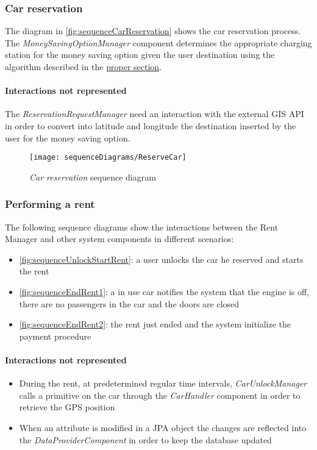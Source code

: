 \subsubsection{Car reservation}
The diagram in \autoref{fig:sequenceCarReservation} shows the car reservation process.\\
The \mbox{\emph{MoneySavingOptionManager}} component determines the appropriate charging station for the money saving option given the user destination using the algorithm described in the \hyperref[sec:msoAlgorithm]{proper section}.

\paragraph{Interactions not represented}The \emph{ReservationRequestManager} need an interaction with the external GIS API in order to convert into latitude and longitude the destination inserted by the user for the money saving option.
\begin{figure}[h!]
	\centering
	\texttt{[image: sequenceDiagrams/ReserveCar]}
	\caption{
		\label{fig:sequenceCarReservation} 
		\emph{Car reservation} sequence diagram
	}
\end{figure}

\clearpage
\subsubsection{Performing a rent}
The following sequence diagrams show the interactions between the \mbox{Rent} \mbox{Manager} and other system components in different scenarios:
\begin{itemize}
	\item \autoref{fig:sequenceUnlockStartRent}: a user unlocks the car he reserved and starts the rent
	\item \autoref{fig:sequenceEndRent1}: a in use car notifies the system that the engine is off, there are no passengers in the car and the doors are closed
	\item \autoref{fig:sequenceEndRent2}: the rent just ended and the system initialize the payment procedure
\end{itemize}

\paragraph{Interactions not represented}
\begin{itemize}
	\item During the rent, at predetermined regular time intervals, \emph{CarUnlockManager} calls a primitive on the car through the \emph{CarHandler} component in order to retrieve the GPS position

	\item When an attribute is modified in a JPA object the changes are reflected into the \emph{DataProviderComponent} in order to keep the database updated
\end{itemize}
\clearpage

